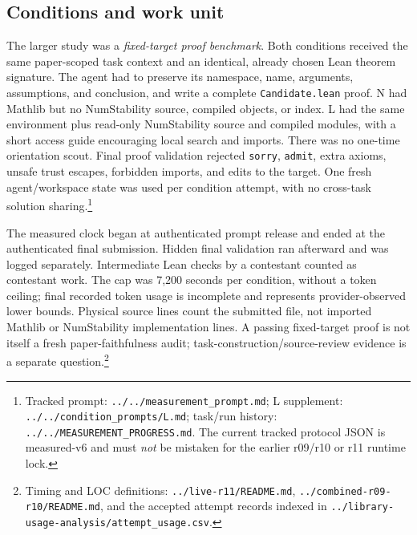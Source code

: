 \documentclass[10pt]{article}
\newcommand{\pathref}[1]{\nolinkurl{#1}}
\begin{document}
\subsection*{Conditions and work unit}
The larger study was a \emph{fixed-target proof benchmark}. Both conditions received the same paper-scoped task context and an identical, already chosen Lean theorem signature. The agent had to preserve its namespace, name, arguments, assumptions, and conclusion, and write a complete \texttt{Candidate.lean} proof. N had Mathlib but no NumStability source, compiled objects, or index. L had the same environment plus read-only NumStability source and compiled modules, with a short access guide encouraging local search and imports. There was no one-time orientation scout. Final proof validation rejected \texttt{sorry}, \texttt{admit}, extra axioms, unsafe trust escapes, forbidden imports, and edits to the target. One fresh agent/workspace state was used per condition attempt, with no cross-task solution sharing.\footnote{Tracked prompt: \pathref{../../measurement_prompt.md}; L supplement: \pathref{../../condition_prompts/L.md}; task/run history: \pathref{../../MEASUREMENT_PROGRESS.md}. The current tracked protocol JSON is measured-v6 and must \emph{not} be mistaken for the earlier r09/r10 or r11 runtime lock.}

The measured clock began at authenticated prompt release and ended at the authenticated final submission. Hidden final validation ran afterward and was logged separately. Intermediate Lean checks by a contestant counted as contestant work. The cap was 7,200 seconds per condition, without a token ceiling; final recorded token usage is incomplete and represents provider-observed lower bounds. Physical source lines count the submitted file, not imported Mathlib or NumStability implementation lines. A passing fixed-target proof is not itself a fresh paper-faithfulness audit; task-construction/source-review evidence is a separate question.\footnote{Timing and LOC definitions: \pathref{../live-r11/README.md}, \pathref{../combined-r09-r10/README.md}, and the accepted attempt records indexed in \pathref{../library-usage-analysis/attempt_usage.csv}.}
\end{document}

